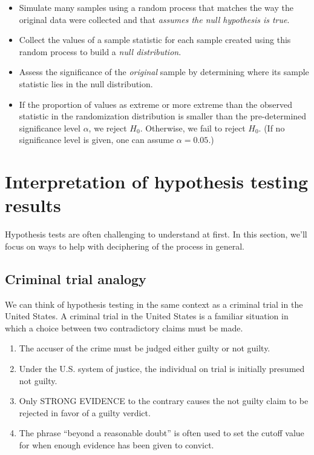 \documentclass[12pt, krantz2,]{krantz}
\begin{document}
\begin{itemize}
\item
  Simulate many samples using a random process that matches the way
  the original data were collected and that \emph{assumes the null hypothesis is
  true}.
\item
  Collect the values of a sample statistic for each sample created using this random process to build
  a \emph{null distribution}.
\item
  Assess the significance of the \emph{original} sample by determining where
  its sample statistic lies in the null distribution.
\item
  If the proportion of values as extreme or more extreme than the observed statistic in the randomization
  distribution is smaller than the pre-determined significance level \(\alpha\), we reject \(H_0\). Otherwise,
  we fail to reject \(H_0\). (If no significance level is given, one can assume \(\alpha = 0.05\).)
\end{itemize}

\hypertarget{ht-interpretation}{%
\section{Interpretation of hypothesis testing results}\label{ht-interpretation}}

Hypothesis tests are often challenging to understand at first. In this section, we'll focus on ways to help with deciphering of the process in general.

\hypertarget{trial}{%
\subsection{Criminal trial analogy}\label{trial}}

We can think of hypothesis testing in the same context as a criminal trial in the United States. A criminal trial in the United States is a familiar situation in which a choice between two contradictory claims must be made.

\begin{enumerate}
\def\labelenumi{\arabic{enumi}.}
\item
  The accuser of the crime must be judged either guilty or not guilty.
\item
  Under the U.S. system of justice, the individual on trial is initially presumed not guilty.
\item
  Only STRONG EVIDENCE to the contrary causes the not guilty claim to be rejected in favor of a guilty verdict.
\item
  The phrase ``beyond a reasonable doubt'' is often used to set the cutoff value for when enough evidence has been given to convict.
\end{enumerate}
\end{document}
